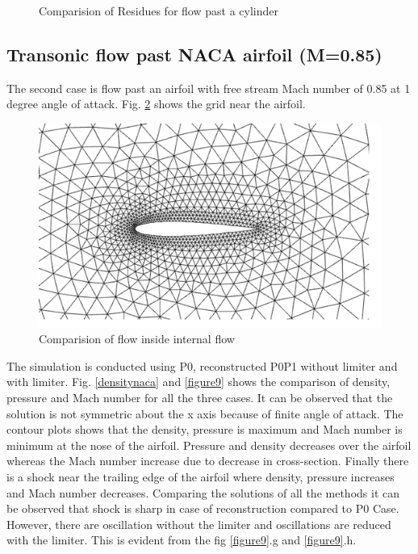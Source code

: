 \documentclass[12pt]{elsarticle}
\begin{document}
\begin{figure}[ht]
		\caption{Comparision of Residues for flow past a cylinder}
		\label{figure7}
	\end{figure}
	
	\clearpage
	\subsection{Transonic flow past NACA airfoil (M=0.85)}
	The second case is flow past an airfoil with free stream Mach number of 0.85 at 1 degree angle of attack. Fig. \ref{airfoil} shows the grid near the airfoil.
	
	\begin{figure}[ht]
		\centering
		\includegraphics[width=0.45\linewidth]{airfoil}
		\caption{Comparision of flow inside internal flow}
		\label{airfoil}
	\end{figure}
	
	The simulation is conducted using P0, reconstructed P0P1 without limiter and with limiter. Fig. \ref{densitynaca} and \ref{figure9} shows the comparison of density, pressure and Mach number for all the three cases. It can be observed that the solution is not symmetric about the x axis because of finite angle of attack.\newline
	\newline
	The contour plots shows that the density, pressure is maximum and Mach number is minimum at the nose of the airfoil. Pressure and density decreases over the airfoil whereas the Mach number increase due to decrease in cross-section. Finally there is a shock near the trailing edge of the airfoil where density,  pressure increases and Mach number decreases. Comparing the solutions of all the methods it can be observed that shock is sharp in case of reconstruction compared to P0 Case. However, there are oscillation without the limiter and oscillations are reduced with the limiter. This is evident from the fig \ref{figure9}.g and \ref{figure9}.h.
	
\end{document}
